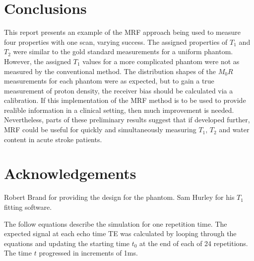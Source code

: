 \documentclass[journal]{IEEEtran}
\begin{document}
\section{Conclusions}
This report presents an example of the MRF approach being used to measure four properties with one scan, varying success. The assigned properties of $T_1$ and $T_2$ were similar to the gold standard measurements for a uniform phantom. However, the assigned $T_1$ values for a more complicated phantom were not as measured by the conventional method. The distribution shapes of the $M_{0}R$ measurements for each phantom were as expected, but to gain a true measurement of proton density, the receiver bias should be calculated via a calibration. If this implementation of the MRF method is to be used to provide realible information in a clinical setting, then much improvement is needed. Nevertheless, parts of these preliminary results suggest that if developed further, MRF could be useful for quickly and simultaneously measuring $T_{1}$, $T_{2}$ and water content in acute stroke patients. 


\section{Acknowledgements}
Robert Brand for providing the design for the phantom. Sam Hurley for his $T_1$ fitting software.


\newpage
{} \label{App:signalSimEquations}

The follow equations describe the simulation for one repetition time. The expected signal at each echo time TE was calculated by looping through the equations and updating the starting time $t_{0}$ at the end of each of 24 repetitions. The time $t$ progressed in increments of 1ms.
\end{document}
